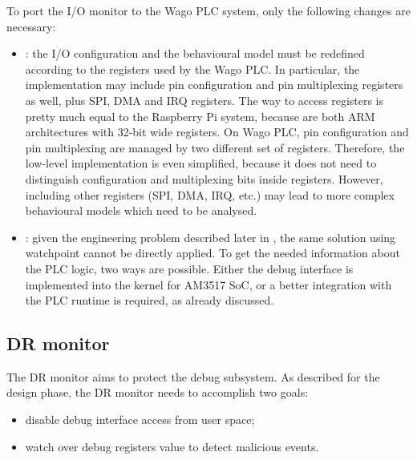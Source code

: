 To port the I/O monitor to the Wago PLC system, only the following changes are necessary:
\begin{itemize}
	\item {}: the I/O configuration and the behavioural model must be redefined according to the registers used by the Wago PLC.
		In particular, the implementation may include pin configuration and pin multiplexing registers as well, plus SPI, DMA and IRQ registers.
		The way to access registers is pretty much equal to the Raspberry Pi system, because are both ARM architectures with 32-bit wide registers.
		On Wago PLC, pin configuration and pin multiplexing are managed by two different set of registers. Therefore, the low-level implementation
		is even simplified, because it does not need to distinguish configuration and multiplexing bits inside registers.
		However, including other registers (\eg SPI, DMA, IRQ, etc.) may lead to more complex behavioural models which need to be analysed.
	\item {}: given the engineering problem described later in , the same solution using watchpoint cannot be directly applied.
		To get the needed information about the PLC logic, two ways are possible. Either the debug interface is implemented into the kernel for AM3517 SoC,
		or a better integration with the PLC runtime is required, as already discussed.
\end{itemize}


\subsection{DR monitor}
\label{sec:dr-impl}

The DR monitor aims to protect the debug subsystem. As described for the design phase, the DR monitor needs to accomplish two goals:
\begin{itemize}
	\item disable debug interface access from user space;
	\item watch over debug registers value to detect malicious events.
\end{itemize}

